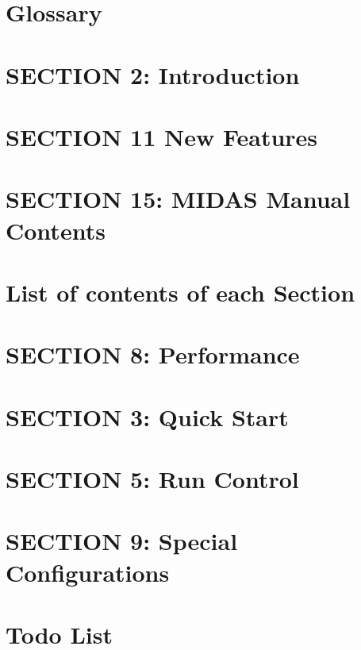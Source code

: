 \documentclass[letterpaper]{article}
\begin{document}
\section{Glossary}
\label{Glossary}

\section{SECTION 2: Introduction}
\label{Intro}

\section{SECTION 11 New Features}
\label{NDF}

\section{SECTION 15: MIDAS Manual Contents}
\label{Organization}

\section{List of contents of each Section}
\label{O_Contents_Page}

\section{SECTION 8: Performance}
\label{Performance}

\section{SECTION 3: Quick Start}
\label{Quickstart}

\section{SECTION 5: Run Control}
\label{RunControl}

\section{SECTION 9: Special Configurations}
\label{SpecialConfig}

\section{Todo List}
\label{todo}

\end{document}
